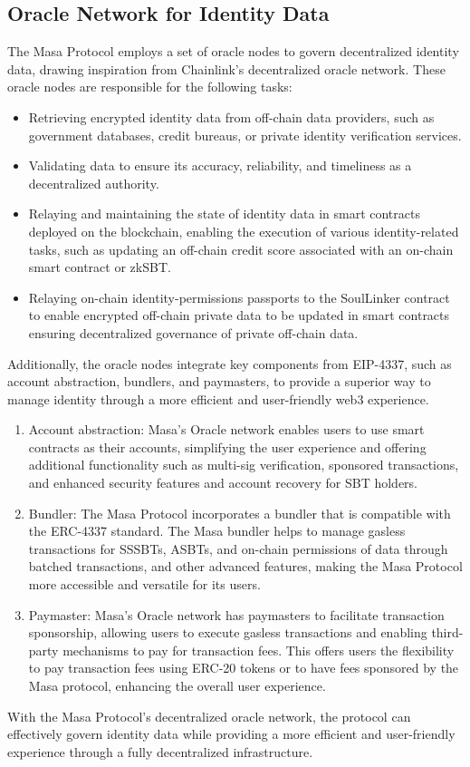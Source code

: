 \documentclass{article}
\begin{document}
\subsection{Oracle Network for Identity Data}
The Masa Protocol employs a set of oracle nodes to govern decentralized identity data, drawing inspiration from Chainlink's\cite{chainlink} decentralized oracle network. These oracle nodes are responsible for the following tasks:
\begin{itemize}
\item Retrieving encrypted identity data from off-chain data providers, such as government databases, credit bureaus, or private identity verification services.
\item Validating data to ensure its accuracy, reliability, and timeliness as a decentralized authority.
\item Relaying and maintaining the state of identity data in smart contracts deployed on the blockchain, enabling the execution of various identity-related tasks, such as updating an off-chain credit score associated with an on-chain smart contract or zkSBT.
\item Relaying on-chain identity-permissions passports to the SoulLinker contract to enable encrypted off-chain private data to be updated in smart contracts ensuring decentralized governance of private off-chain data. 
\end{itemize}
Additionally, the oracle nodes integrate key components from EIP-4337, such as account abstraction, bundlers, and paymasters, to provide a superior way to manage identity through a more efficient and user-friendly web3 experience.
\begin{enumerate}
\item Account abstraction: Masa's Oracle network enables users to use smart contracts as their accounts, simplifying the user experience and offering additional functionality such as multi-sig verification, sponsored transactions, and enhanced security features and account recovery for SBT holders.
\item Bundler: The Masa Protocol incorporates a bundler that is compatible with the ERC-4337 standard. The Masa bundler helps to manage gasless transactions for SSSBTs, ASBTs, and on-chain permissions of data through batched transactions, and other advanced features, making the Masa Protocol more accessible and versatile for its users.
\item Paymaster: Masa's Oracle network has paymasters to facilitate transaction sponsorship, allowing users to execute gasless transactions and enabling third-party mechanisms to pay for transaction fees. This offers users the flexibility to pay transaction fees using ERC-20 tokens or to have fees sponsored by the Masa protocol, enhancing the overall user experience.
\end{enumerate}
With the Masa Protocol's decentralized oracle network, the protocol can effectively govern identity data while providing a more efficient and user-friendly experience through a fully decentralized infrastructure.
\end{document}
